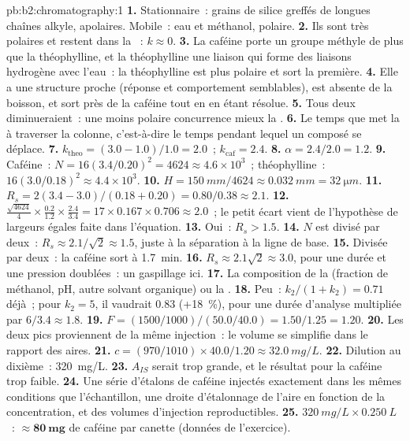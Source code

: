 \begin{solution}{pb:b2:chromatography:1}
\textbf{1.} Stationnaire~: grains de silice greffés de longues chaînes alkyle, apolaires. Mobile~: eau et
méthanol, polaire.
\textbf{2.} Ils sont très polaires et restent dans la ~: $k \approx 0$.
\textbf{3.} La caféine porte un groupe méthyle de plus que la théophylline, et la théophylline une liaison
 qui forme des liaisons hydrogène avec l'eau~: la théophylline est plus polaire et sort la première.
\textbf{4.} Elle a une structure proche (réponse et comportement semblables), est absente de la boisson, et
sort près de la caféine tout en en étant résolue.
\textbf{5.} Tous deux diminueraient~: une  moins polaire concurrence mieux la .
\textbf{6.} Le temps que met la  à traverser la colonne, c'est-à-dire le temps pendant lequel un
composé se déplace.
\textbf{7.} $k_{\mathrm{theo}} = (3.0 - 1.0)/1.0 = 2.0$~; $k_{\mathrm{caf}} = 2.4$.
\textbf{8.} $\alpha = 2.4/2.0 = 1.2$.
\textbf{9.} Caféine~: $N = 16(3.4/0.20)^2 = 4624 \approx 4.6 \times 10^3$~; théophylline~: $16(3.0/0.18)^2
\approx 4.4 \times 10^3$.
\textbf{10.} $H = \qty{150}{mm}/4624 \approx \qty{0.032}{mm} = \qty{32}{\micro m}$.
\textbf{11.} $R_s = 2(3.4 - 3.0)/(0.18 + 0.20) = 0.80/0.38 \approx 2.1$.
\textbf{12.} $\frac{\sqrt{4624}}{4} \times \frac{0.2}{1.2} \times \frac{2.4}{3.4} = 17 \times 0.167 \times
0.706 \approx 2.0$~; le petit écart vient de l'hypothèse de largeurs égales faite dans l'équation.
\textbf{13.} Oui~: $R_s > 1.5$.
\textbf{14.} $N$ est divisé par deux~: $R_s \approx 2.1/\sqrt2 \approx 1.5$, juste à la séparation à la ligne de base.
\textbf{15.} Divisée par deux~: la caféine sort à \qty{1.7}{min}.
\textbf{16.} $R_s \approx 2.1\sqrt2 \approx 3.0$, pour une durée et une pression doublées~: un gaspillage ici.
\textbf{17.} La composition de la  (fraction de méthanol, pH, autre solvant organique) ou la
.
\textbf{18.} Peu~: $k_2/(1 + k_2) = 0.71$ déjà~; pour $k_2 = 5$, il vaudrait 0.83 (+18~\%), pour une
durée d'analyse multipliée par $6/3.4 \approx 1.8$.
\textbf{19.} $F = (1500/1000)/(50.0/40.0) = 1.50/1.25 = 1.20$.
\textbf{20.} Les deux pics proviennent de la même injection~: le volume se simplifie dans le rapport des aires.
\textbf{21.} $c = (970/1010) \times 40.0/1.20 \approx \qty{32.0}{mg/L}$.
\textbf{22.} Dilution au dixième~: \qty{320}{mg/L}.
\textbf{23.} $A_{IS}$ serait trop grande, et le résultat pour la caféine trop faible.
\textbf{24.} Une série d'étalons de caféine injectés exactement dans les mêmes conditions que l'échantillon,
une droite d'étalonnage de l'aire en fonction de la concentration, et des volumes d'injection reproductibles.
\textbf{25.} $\qty{320}{mg/L} \times \qty{0.250}{L}$~: $\boldsymbol{\approx \qty{80}{mg}}$ de caféine par canette
(données de l'exercice).
\end{solution}
